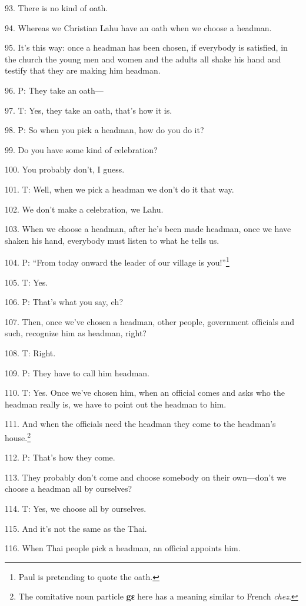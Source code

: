 93. There is no kind of oath.

94. Whereas we Christian Lahu have an oath when we choose a headman.

95. It's this way: once a headman has been chosen, if everybody is satisfied, in
the church the young men and women and the adults all shake his hand and testify
that they are making him headman.

96. P: They take an oath---

97. T: Yes, they take an oath, that's how it is.

98. P: So when you pick a headman, how do you do it?

99. Do you have some kind of celebration?

100. You probably don't, I guess.

101. T: Well, when we pick a headman we don't do it that way.

102. We don't make a celebration, we Lahu.

103. When we choose a headman, after he's been made headman, once we have shaken
his hand, everybody must listen to what he tells us.

104. P: ``From today onward the leader of our village is you!''\footnote{Paul is pretending to quote the oath.}

105. T: Yes.

106. P: That's what you say, eh?

107. Then, once we've chosen a headman, other people, government officials and
such, recognize him as headman, right?

108. T: Right.

109. P: They have to call him headman.

110. T: Yes. Once we've chosen him, when an official comes and asks who the headman
really is, we have to point out the headman to him.

111. And when the officials need the headman they come to the headman's house.\footnote{The comitative noun particle \textbf{gɛ} here has a meaning similar to French \textit{chez}.}

112. P: That's how they come.

113. They probably don't come and choose somebody on their own---don't we choose
a headman all by ourselves?

114. T: Yes, we choose all by ourselves.

115. And it's not the same as the Thai.

116. When Thai people pick a headman, an official appoints him.

